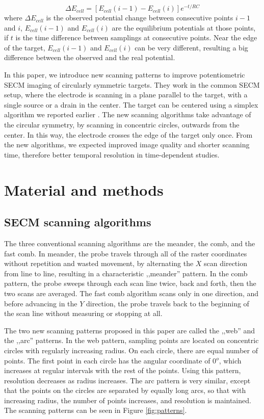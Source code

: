 \documentclass[3p]{elsarticle}
\begin{document}
\begin{equation}
\label{eq:rc2}
	\Delta E_{cell} = [E_{cell}(i-1) - E_{cell}(i)]e^{-t/RC}
\end{equation}
where $\Delta E_{cell}$ is the observed potential change between consecutive points $i-1$ and $i$, $E_{cell}(i-1)$ and $E_{cell}(i)$ are the equilibrium potentials at those points, if $t$ is the time difference between samplings at consecutive points. Near the edge of the target, $E_{cell}(i-1)$ and $E_{cell}(i)$ can be very different, resulting a big difference between the observed and the real potential.

In this paper, we introduce new scanning patterns to improve potentiometric SECM imaging of circularly symmetric targets. They work in the common SECM setup, where the electrode is scanning in a plane parallel to the target, with a single source or a drain in the center. The target can be centered using a simplex algorithm we reported earlier \cite{simplex}. The new scanning algorithms take advantage of the circular symmetry, by scanning in concentric circles, outwards from the center. In this way, the electrode crosses the edge of the target only once. From the new algorithms, we expected improved image quality and shorter scanning time, therefore better temporal resolution in time-dependent studies.

\section{Material and methods}

\subsection{SECM scanning algorithms}
The three conventional scanning algorithms are the meander, the comb, and the fast comb. In meander, the probe travels through all of the raster coordinates without repetition and wasted movement, by alternating the $X$ scan direction from line to line, resulting in a characteristic ,,meander'' pattern. In the comb pattern, the probe sweeps through each scan line twice, back and forth, then the two scans are averaged. The fast comb algorithm scans only in one direction, and before advancing in the $Y$ direction, the probe travels back to the beginning of the scan line without measuring or stopping at all.

The two new scanning patterns proposed in this paper are called the ,,web'' and the ,,arc'' patterns. In the web pattern, sampling points are located on concentric circles with regularly increasing radius. On each circle, there are equal number of points. The first point in each circle has the angular coordinate of 0$^{o}$, which increases at regular intervals with the rest of the points. Using this pattern, resolution decreases as radius increases. The arc pattern is very similar, except that the points on the circles are separated by equally long arcs, so that with increasing radius, the number of points increases, and resolution is maintained. The scanning patterns can be seen in Figure \ref{fig:patterns}.
\end{document}
